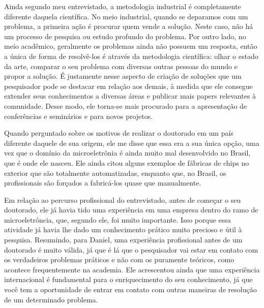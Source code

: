 \documentclass{article}
\begin{document}
\vspace{12pt}

Ainda segundo meu entrevistado, a metodologia industrial é completamente
diferente daquela científica. No meio industrial, quando se deparamos com um
problema, a primeira ação é procurar quem vende a solução. Neste caso, não há um
processo de pesquisa ou estudo profundo do problema. Por outro lado, no meio
acadêmico, geralmente os problemas ainda não possuem um resposta, então a única
de forma de resolvê-los é através da metodologia científica: olhar o estado da
arte, comparar o seu problema com diversas outras pessoas do mundo e propor a
solução. É justamente nesse aspecto de criação de soluções que um pesquisador
pode se destacar em relação aos demais, à medida que ele consegue extender seus
conhecimentos a diversas áreas e publicar mais papers relevantes à comunidade.
Desse modo, ele torna-se mais procurado para a apresentação de conferências e
seminários e para novos projetos.

\vspace{12pt}

Quando perguntado sobre os motivos de realizar o doutorado em um país diferente
daquele de sua origem, ele me disse que essa era a sua única opção, uma vez que
o domínio da microeletrônia é ainda muito mal desenvolvido no Brasil, que é onde
ele nasceu. Ele ainda citou alguns exemplos de fábricas de chips no exterior que
são totalmente automatizadas, enquanto que, no Brasil, os profissionais são
forçados a fabricá-los quase que manualmente.

\vspace{12pt}
 
Em relação ao percurso profissional do entrevistado, antes de começar o seu
doutorado, ele já havia tido uma experiência em uma empresa dentro do ramo
de microeletrôncia, que, segundo ele, foi muito importante. Isso porque essa
atividade já havia lhe dado um conhecimento prático muito precioso e útil à
pesquisa. Resumindo, para Daniel, uma experiência profissional antes de um
doutorado é muito válida, já que é lá que o pesquisador vai estar em contato com
os verdadeiros problemas práticos e não com os puramente teóricos, como acontece
frequentemente na academia. Ele acrescentou ainda que uma experiência
internacional é fundamental para o enriquecimento do seu conhecimento, já que
você tem a oportunidade de entrar em contato com outras maneiras de resolução de
um determinado problema.
 
\vspace{12pt}
\end{document}
